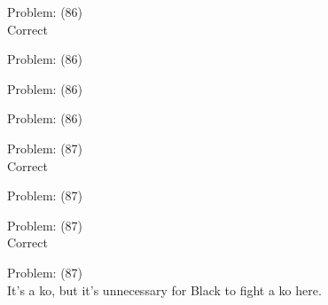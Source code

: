 \documentclass[11pt]{article}
\begin{document}
\begin{minipage}[t]{0.5\textwidth}
  {\centering
  
  Problem: (86)\\
  Correct\\
  }
\end{minipage}
\begin{minipage}[t]{0.5\textwidth}
  {\centering
  
  Problem: (86)\\
  
  }
\end{minipage}
\begin{minipage}[t]{0.5\textwidth}
  {\centering
  
  Problem: (86)\\
  
  }
\end{minipage}
\begin{minipage}[t]{0.5\textwidth}
  {\centering
  
  Problem: (86)\\
  
  }
\end{minipage}
\begin{minipage}[t]{0.5\textwidth}
  {\centering
  
  Problem: (87)\\
  Correct\\
  }
\end{minipage}
\begin{minipage}[t]{0.5\textwidth}
  {\centering
  
  Problem: (87)\\
  
  }
\end{minipage}
\begin{minipage}[t]{0.5\textwidth}
  {\centering
  
  Problem: (87)\\
  Correct\\
  }
\end{minipage}
\begin{minipage}[t]{0.5\textwidth}
  {\centering
  
  Problem: (87)\\
  It's a ko, but it's unnecessary for Black to fight a ko here.\\
  }
\end{minipage}
\end{document}
